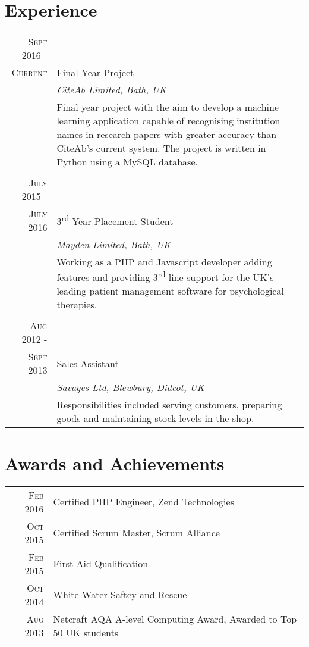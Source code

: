 \documentclass[a4paper,12pt]{article}
\begin{document}
\vspace{1cm}
\section{Experience}
\begin{tabular}{rp{11cm}}
\textsc{Sept} 2016 -\\ \textsc{Current} & Final Year Project \\&\emph{CiteAb Limited, Bath, UK}\\&\footnotesize{Final year project with the aim to develop a machine learning application capable of recognising institution names
 in research papers with greater accuracy than CiteAb's current system. The project is written in Python using a MySQL database.}\\\multicolumn{2}{c}{} \\

\textsc{July} 2015 -\\ \textsc{July} 2016 & 3\textsuperscript{rd} Year Placement Student \\&\emph{Mayden Limited, Bath, UK}\\&\footnotesize{Working as a PHP and Javascript developer adding features and providing 3\textsuperscript{rd} line support for the UK's leading patient management software for psychological therapies.}\\\multicolumn{2}{c}{} \\
\textsc{Aug} 2012 -\\ \textsc{Sept} 2013 & Sales Assistant\\&\emph{Savages Ltd, Blewbury, Didcot, UK}\\&\footnotesize{Responsibilities included serving customers, preparing goods and maintaining stock levels in the shop.  }\\
\end{tabular}

\vspace{1cm}
\section{Awards and Achievements}
\begin{tabular}{rl}
 \textsc{Feb} 2016 & Certified PHP Engineer, Zend Technologies\\
 \textsc{Oct} 2015 & Certified Scrum Master, Scrum Alliance\\
 \textsc{Feb} 2015 & First Aid Qualification\\
 \textsc{Oct} 2014 & White Water Saftey and Rescue\\
 \textsc{Aug} 2013 & Netcraft AQA A-level Computing Award, Awarded to Top 50 UK students\\
\end{tabular}
\end{document}
